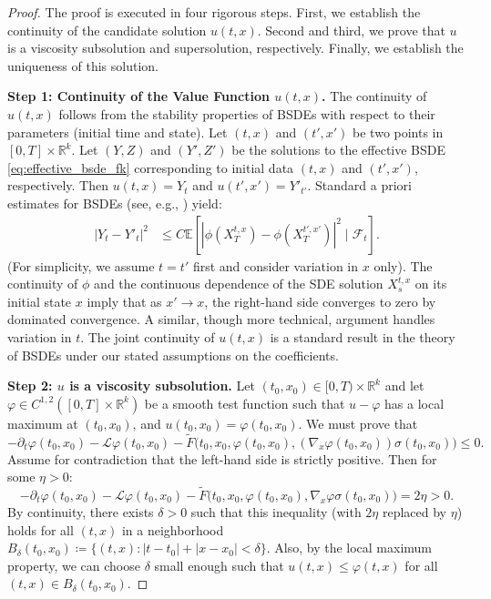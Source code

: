 \documentclass[12pt, letterpaper]{amsart}
\newcommand{\R}{\mathbb{R}}
\theoremstyle{plain}
\theoremstyle{definition}
\theoremstyle{remark}
\numberwithin{equation}{section} %
\begin{document}
\begin{proof}
The proof is executed in four rigorous steps. First, we establish the continuity of the candidate solution $u(t,x)$. Second and third, we prove that $u$ is a viscosity subsolution and supersolution, respectively. Finally, we establish the uniqueness of this solution.

\vspace{1ex}
\noindent\textbf{Step 1: Continuity of the Value Function $u(t,x)$.}
The continuity of $u(t,x)$ follows from the stability properties of BSDEs with respect to their parameters (initial time and state). Let $(t,x)$ and $(t',x')$ be two points in $[0,T]\times\R^k$. Let $(Y,Z)$ and $(Y',Z')$ be the solutions to the effective BSDE \eqref{eq:effective_bsde_fk} corresponding to initial data $(t,x)$ and $(t',x')$, respectively. Then $u(t,x) = Y_t$ and $u(t',x')=Y'_{t'}$.
Standard a priori estimates for BSDEs (see, e.g., \cite[Theorem 2.6]{ElKaroui1997}) yield:
\begin{align*}
|Y_t - Y'_t|^2 &\le C \mathbb{E}\left[ |\phi(X_T^{t,x}) - \phi(X_T^{t',x'})|^2 \mid \mathcal{F}_t \right].
\end{align*}
(For simplicity, we assume $t=t'$ first and consider variation in $x$ only). The continuity of $\phi$ and the continuous dependence of the SDE solution $X_s^{t,x}$ on its initial state $x$ imply that as $x' \to x$, the right-hand side converges to zero by dominated convergence. A similar, though more technical, argument handles variation in $t$. The joint continuity of $u(t,x)$ is a standard result in the theory of BSDEs under our stated assumptions on the coefficients.

\vspace{1ex}
\noindent\textbf{Step 2: $u$ is a viscosity subsolution.}
Let $(t_0, x_0) \in [0,T) \times \R^k$ and let $\varphi \in C^{1,2}([0,T]\times\R^k)$ be a smooth test function such that $u - \varphi$ has a local maximum at $(t_0, x_0)$, and $u(t_0,x_0) = \varphi(t_0,x_0)$. We must prove that
\begin{equation} \label{eq:subsolution_ineq}
    -\partial_t \varphi(t_0,x_0) - \mathcal{L}\varphi(t_0,x_0) - \tilde{F}\big(t_0, x_0, \varphi(t_0,x_0), (\nabla_x \varphi(t_0,x_0))\sigma(t_0,x_0)\big) \le 0.
\end{equation}
Assume for contradiction that the left-hand side is strictly positive. Then for some $\eta > 0$:
\begin{equation} \label{eq:contra_sub}
    -\partial_t \varphi(t_0,x_0) - \mathcal{L}\varphi(t_0,x_0) - \tilde{F}\big(t_0, x_0, \varphi(t_0,x_0), \nabla_x\varphi\sigma(t_0,x_0)\big) = 2\eta > 0.
\end{equation}
By continuity, there exists $\delta > 0$ such that this inequality (with $2\eta$ replaced by $\eta$) holds for all $(t,x)$ in a neighborhood $B_\delta(t_0,x_0) \coloneqq \{(t,x) : |t-t_0| + |x-x_0| < \delta\}$. Also, by the local maximum property, we can choose $\delta$ small enough such that $u(t,x) \le \varphi(t,x)$ for all $(t,x) \in B_\delta(t_0,x_0)$.


\end{proof}
\end{document}
